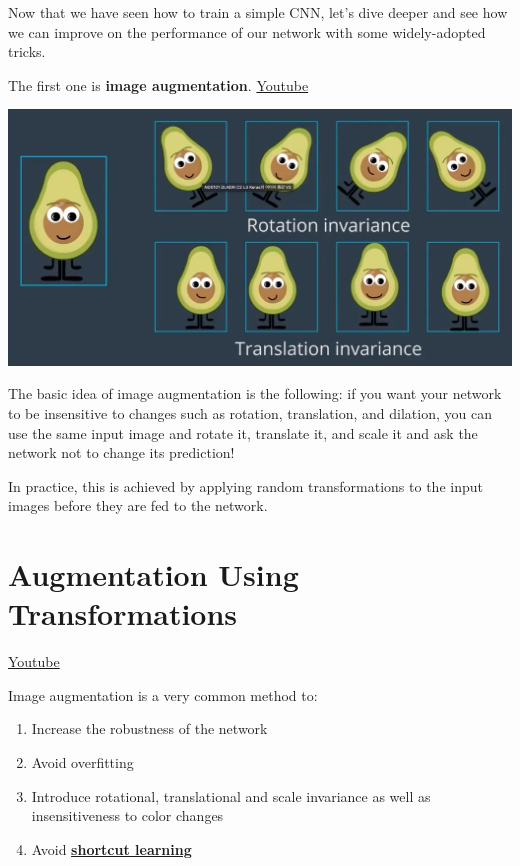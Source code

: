 Now that we have seen how to train a simple CNN, let’s dive deeper and see how we can improve on the performance of our network with some widely-adopted tricks.\newline

The first one is \textbf{image augmentation}. \href{https://www.youtube.com/watch?v=OEzHz9USHWY&t=2s&ab_channel=Udacity}{Youtube}

\includegraphics[width=1\linewidth]{img//cnn//depth/imageaugmentation.png}

The basic idea of image augmentation is the following: if you want your network to be insensitive to changes such as rotation, translation, and dilation, you can use the same input image and rotate it, translate it, and scale it and ask the network not to change its prediction! \newline

In practice, this is achieved by applying random transformations to the input images before they are fed to the network.

\section{Augmentation Using Transformations}
\href{https://www.youtube.com/watch?v=RUNIokjb2vM&ab_channel=Udacity}{Youtube} \newline

Image augmentation is a very common method to:

\begin{enumerate}
    \item Increase the robustness of the network
    \item Avoid overfitting
    \item Introduce rotational, translational and scale invariance as well as insensitiveness to color changes
    \item Avoid \href{https://news.mit.edu/2021/shortcut-artificial-intelligence-1102}{\textbf{shortcut learning}}
\end{enumerate}

